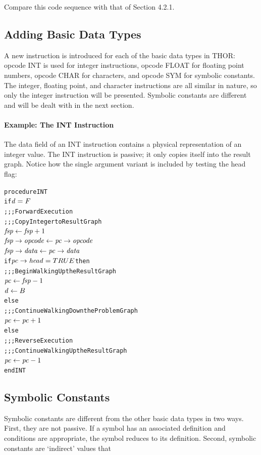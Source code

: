 Compare this code sequence with that of Section 4.2.1.

\subsection{Adding Basic Data Types}

A new instruction is introduced for each of the basic data types in THOR: opcode INT is
used for integer instructions, opcode FLOAT for floating point numbers, opcode CHAR for
characters, and opcode SYM for symbolic constants. The integer, floating point, and
character instructions are all similar in nature, so only the integer instruction will be
presented. Symbolic constants are different and will be dealt with in the next section.

\paragraph{Example: The INT Instruction}

The data field of an INT instruction contains a physical representation of an integer
value. The INT instruction is passive; it only copies itself into the result graph.
Notice how the single argument variant is included by testing the head flag:

\begin{alltt}
procedure INT
  if \(\rt{d} = F\)
    ;;; Forward Execution
    ;;; Copy Integer to Result Graph
    \(\rt{fsp} \leftarrow \rt{fsp}+1\)
    \(\rtfield{fsp}{opcode} \leftarrow \rtfield{pc}{opcode}\)
    \(\rtfield{fsp}{data} \leftarrow \rtfield{pc}{data}\)
    if \(\rtfield{pc}{head} = TRUE\) then
      ;;; Begin Walking Up the Result Graph
      \(\rt{pc} \leftarrow \rt{fsp}-1\)
      \(\rt{d} \leftarrow B\)
    else
      ;;; Continue Walking Down the Problem Graph
      \(\rt{pc} \leftarrow \rt{pc}+1\)
  else
    ;;; Reverse Execution
    ;;; Continue Walking Up the Result Graph
    \(\rt{pc} \leftarrow \rt{pc}-1\)
end INT
\end{alltt}

\subsection{Symbolic Constants}

Symbolic constants are different from the other basic data types in two ways. First, they
are not passive. If a symbol has an associated definition and conditions are appropriate,
the symbol reduces to its definition. Second, symbolic constants are `indirect' values that

